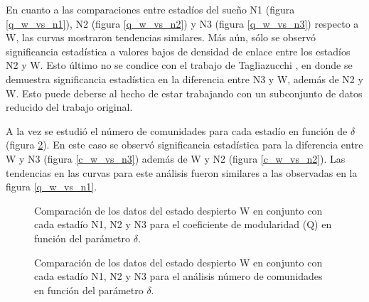 \documentclass{article}
\begin{document}
En cuanto a las comparaciones entre estadíos del sueño N1 (figura \ref{q_w_vs_n1}), N2 (figura \ref{q_w_vs_n2}) y N3 (figura \ref{q_w_vs_n3}) respecto a W, las curvas mostraron tendencias similares. Más aún, sólo se observó significancia estadística a valores bajos de densidad de enlace entre los estadíos N2 y W. Esto último no se condice con el trabajo de Tagliazucchi \cite{Tagliazucchi:2013aa}, en donde se demuestra significancia estadística en la diferencia entre N3 y W, además de N2 y W. Esto puede deberse al hecho de estar trabajando con un subconjunto de datos reducido del trabajo original.

A la vez se estudió el número de comunidades para cada estadío en función de $\delta$ (figura \ref{fig:comunidad_delta}). En este caso se observó significancia estadística para la diferencia entre W y N3 (figura \ref{c_w_vs_n3}) además de W y N2 (figura \ref{c_w_vs_n2}). Las tendencias en las curvas para este análisis fueron similares a las observadas en la figura \ref{q_w_vs_n1}.

\begin{figure}[H]
    \centering
    \hfill
    \hfill
    \hfill
    \caption[]{Comparación de los datos del estado despierto W en conjunto con cada estadío N1, N2 y N3 para el coeficiente de modularidad (Q) en función del parámetro $\delta$. \footnotemark }
    \label{fig:q_w_n1_n2_n3}
\end{figure}

\begin{figure}[H]
    \centering
    \hfill
    \hfill
    \hfill
    \caption[]{Comparación de los datos del estado despierto W en conjunto con cada estadío N1, N2 y N3 para el análisis número de comunidades en función del parámetro $\delta$. \footnotemark }
    \label{fig:comunidad_delta}
\end{figure}
\end{document}
